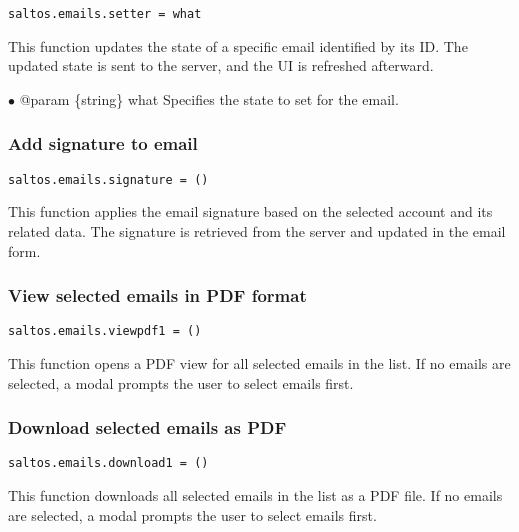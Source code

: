 \documentclass[a4paper]{article}
\begin{document}
\begin{lstlisting}
saltos.emails.setter = what
\end{lstlisting}

This function updates the state of a specific email identified by its ID. The updated state is sent
to the server, and the UI is refreshed afterward.

\begin{compactitem}
\item[\color{myblue}$\bullet$] @param \{string\} what Specifies the state to set for the email.
\end{compactitem}

\hypertarget{toc57}{}
\subsubsection{Add signature to email}

\begin{lstlisting}
saltos.emails.signature = ()
\end{lstlisting}

This function applies the email signature based on the selected account and its related data.
The signature is retrieved from the server and updated in the email form.

\hypertarget{toc58}{}
\subsubsection{View selected emails in PDF format}

\begin{lstlisting}
saltos.emails.viewpdf1 = ()
\end{lstlisting}

This function opens a PDF view for all selected emails in the list.
If no emails are selected, a modal prompts the user to select emails first.

\hypertarget{toc59}{}
\subsubsection{Download selected emails as PDF}

\begin{lstlisting}
saltos.emails.download1 = ()
\end{lstlisting}

This function downloads all selected emails in the list as a PDF file.
If no emails are selected, a modal prompts the user to select emails first.
\end{document}
